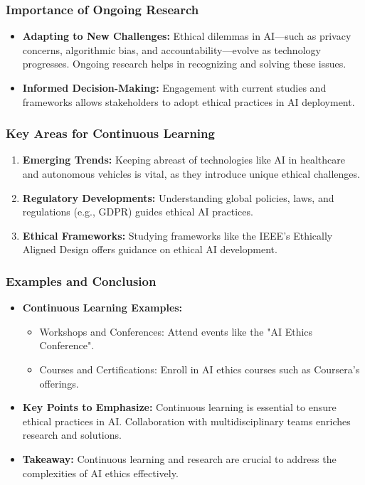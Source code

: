 \documentclass[aspectratio=169]{beamer}
\begin{document}
\begin{frame}[fragile]
    \frametitle{Importance of Ongoing Research}
    \begin{itemize}
        \item \textbf{Adapting to New Challenges:} 
        Ethical dilemmas in AI—such as privacy concerns, algorithmic bias, and accountability—evolve as technology progresses. Ongoing research helps in recognizing and solving these issues.
        
        \item \textbf{Informed Decision-Making:}
        Engagement with current studies and frameworks allows stakeholders to adopt ethical practices in AI deployment.
    \end{itemize}
\end{frame}

\begin{frame}[fragile]
    \frametitle{Key Areas for Continuous Learning}
    \begin{enumerate}
        \item \textbf{Emerging Trends:} Keeping abreast of technologies like AI in healthcare and autonomous vehicles is vital, as they introduce unique ethical challenges.
        
        \item \textbf{Regulatory Developments:} 
        Understanding global policies, laws, and regulations (e.g., GDPR) guides ethical AI practices.
        
        \item \textbf{Ethical Frameworks:} 
        Studying frameworks like the IEEE's Ethically Aligned Design offers guidance on ethical AI development.
    \end{enumerate}
\end{frame}

\begin{frame}[fragile]
    \frametitle{Examples and Conclusion}
    \begin{itemize}
        \item \textbf{Continuous Learning Examples:}
        \begin{itemize}
            \item Workshops and Conferences: Attend events like the "AI Ethics Conference".
            \item Courses and Certifications: Enroll in AI ethics courses such as Coursera's offerings.
        \end{itemize}
        
        \item \textbf{Key Points to Emphasize:}
        Continuous learning is essential to ensure ethical practices in AI. Collaboration with multidisciplinary teams enriches research and solutions.
        
        \item \textbf{Takeaway:}
        Continuous learning and research are crucial to address the complexities of AI ethics effectively.
    \end{itemize}
\end{frame}
\end{document}
